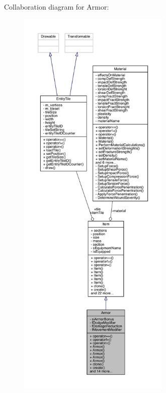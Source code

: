 Collaboration diagram for Armor\+:
\nopagebreak
\begin{figure}[H]
\begin{center}
\leavevmode
\includegraphics[height=550pt]{d0/d90/class_armor__coll__graph}
\end{center}
\end{figure}
